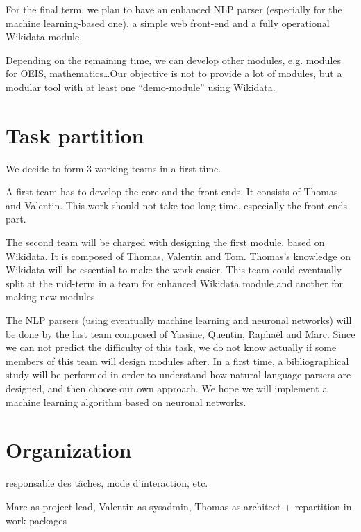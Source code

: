 \documentclass[a4paper,10pt]{article}
\begin{document}
For the final term, we plan to have an enhanced NLP parser (especially for the 
machine learning-based one), a simple web front-end and a fully operational 
Wikidata module.

Depending on the remaining time, we can develop other modules, e.g. modules for 
OEIS, mathematics\ldots Our objective is not to provide a lot of modules, but a 
modular tool with at least one ``demo-module'' using Wikidata.

\section{Task partition}

We decide to form 3 working teams in a first time.

A first team has to develop the core and the front-ends. It consists of Thomas 
and Valentin. This work should not take too long time, especially the front-ends 
part.

The second team will be charged with designing the first module, based on 
Wikidata. It is composed of Thomas, Valentin and Tom. Thomas's knowledge on 
Wikidata will be essential to make the work easier. This team could eventually 
split at the mid-term in a team for enhanced Wikidata module and another for 
making new modules.

The NLP parsers (using eventually machine learning and neuronal networks) will 
be done by the last team composed of Yassine, Quentin, Raphaël and Marc. Since 
we can not predict the difficulty of this task, we do not know actually if some 
members of this team will design modules after. In a first time, a bibliographical 
study will be performed in order to understand how natural language parsers are 
designed, and then choose our own approach. We hope we will implement a machine 
learning algorithm based on neuronal networks. 



\section{Organization}

responsable des tâches, mode d’interaction, etc.

Marc as project lead, Valentin as sysadmin, Thomas as architect + repartition in 
work packages

\end{document}
